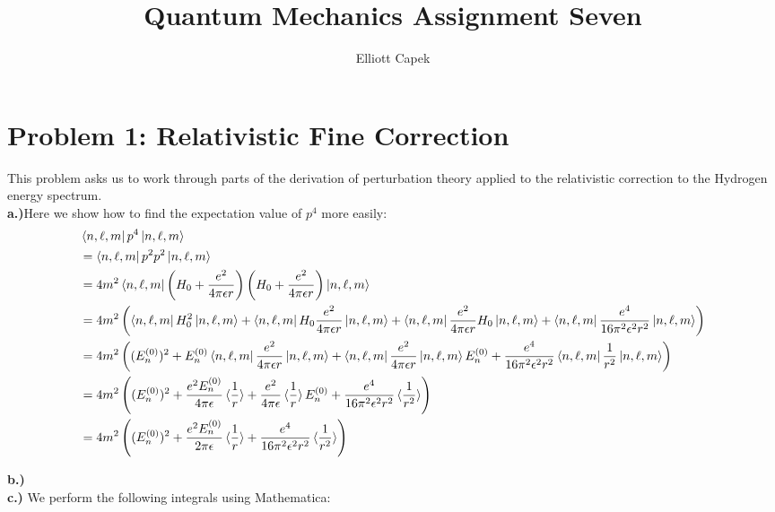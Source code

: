 \documentclass[10pt]{article} %
\title{Quantum Mechanics Assignment Seven}
\author{Elliott Capek}
\begin{document}
\maketitle{}


\section{Problem 1: Relativistic Fine Correction}

This problem asks us to work through parts of the derivation of perturbation theory applied to
the relativistic correction to the Hydrogen energy spectrum.\\

\textbf{a.)}Here we show how to find the expectation value of $p^4$ more easily:\\

\begin{align*}
  &\bra{n,\ell,m}p^4\ket{n,\ell,m}\\
  &= \bra{n,\ell,m}p^2p^2\ket{n,\ell,m}\\
  &= 4m^2\bra{n,\ell,m}\left(H_0 + \frac{e^2}{4\pi\epsilon r}\right)
  \left(H_0 + \frac{e^2}{4\pi\epsilon r}\right)\ket{n,\ell,m}\\
  &= 4m^2\left(\bra{n,\ell,m}H_0^2\ket{n,\ell,m}
  + \bra{n,\ell,m}H_0\frac{e^2}{4\pi\epsilon r}\ket{n,\ell,m}
  + \bra{n,\ell,m}\frac{e^2}{4\pi\epsilon r}H_0\ket{n,\ell,m}
  + \bra{n,\ell,m}\frac{e^4}{16\pi^2\epsilon^2r^2}\ket{n,\ell,m}\right)\\
  &= 4m^2\left((E_n^{(0)})^2
  + E_n^{(0)}\bra{n,\ell,m}\frac{e^2}{4\pi\epsilon r}\ket{n,\ell,m}
  + \bra{n,\ell,m}\frac{e^2}{4\pi\epsilon r}\ket{n,\ell,m}E_n^{(0)}
  + \frac{e^4}{16\pi^2\epsilon^2r^2}\bra{n,\ell,m}\frac{1}{r^2}\ket{n,\ell,m}\right)\\
  &= 4m^2\left((E_n^{(0)})^2
  + \frac{e^2E_n^{(0)}}{4\pi\epsilon}\braket{\frac{1}{r}}
  + \frac{e^2}{4\pi\epsilon}\braket{\frac{1}{r}}E_n^{(0)}
  + \frac{e^4}{16\pi^2\epsilon^2r^2}\braket{\frac{1}{r^2}}\right)\\
  &= 4m^2\left((E_n^{(0)})^2
  + \frac{e^2E_n^{(0)}}{2\pi\epsilon}\braket{\frac{1}{r}}
  + \frac{e^4}{16\pi^2\epsilon^2r^2}\braket{\frac{1}{r^2}}\right)\\
\end{align*}

\textbf{b.)}\\

\textbf{c.)} We perform the following integrals using Mathematica:
\end{document}
